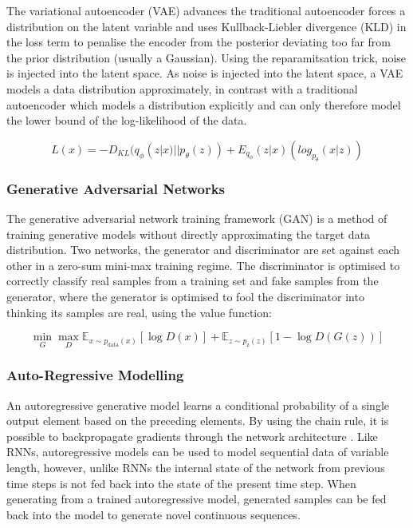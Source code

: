 The variational autoencoder (VAE) \citep{kingma2013auto, rezende2014stochastic} advances the traditional autoencoder forces a distribution on the latent variable and uses Kullback-Liebler divergence (KLD) in the loss term to penalise the encoder from the posterior deviating too far from the prior distribution (usually a Gaussian). 
Using the reparamitsation trick, noise is injected into the latent space. 
As noise is injected into the latent space, a VAE models a data distribution approximately, in contrast with a traditional autoencoder which models a distribution explicitly and can only therefore model the lower bound of the log-likelihood of the data. 

\begin{equation}
\label{eq:vae}
L(x) = -D_{KL}(q_{\phi}(z|x)||p_{\theta}(z)) + E_{q_\phi}(z|x)(log_{p_{\theta}}(x|z))
\end{equation}

\subsubsection{Generative Adversarial Networks}

The generative adversarial network training framework (GAN) \cite{goodfellow2014generative} is a method of training generative models without directly approximating the target data distribution. 
Two networks, the generator and discriminator are set against each other in a zero-sum mini-max training regime. 
The discriminator is optimised to correctly classify real samples from a training set and fake samples from the generator, where the generator is optimised to fool the discriminator into thinking its samples are real, using the value function: 

\begin{equation}
\label{eq:gan}
\min_{G}\max_{D}\mathbb{E}_{x\sim p_{\text{data}}(x)}[\log{D(x)}] + \mathbb{E}_{z\sim p_{\text{z}}(z)}[1 - \log{D(G(z))}]
\end{equation}

\subsubsection{Auto-Regressive Modelling}
\label{c2:subsubsec:autoregressive}

An autoregressive generative model learns a conditional probability of a single output element based on the preceding elements. 
By using the chain rule, it is possible to backpropagate gradients through the network architecture \cite{larochelle2011neural}. 
Like RNNs, autoregressive models can be used to model sequential data of variable length, however, unlike RNNs the internal state of the network from previous time steps is not fed back into the state of the present time step. 
When generating from a trained autoregressive model, generated samples can be fed back into the model to generate novel continuous sequences.

